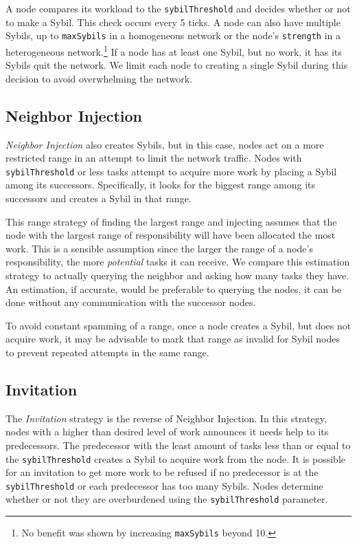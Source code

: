 \documentclass[10pt,conference]{IEEEtran}
\begin{document}
A node compares its workload to the \texttt{sybilThreshold} and decides whether or not to make a Sybil.
This check occurs every 5 ticks.
A node can also have multiple Sybils, up to \texttt{maxSybils} in a homogeneous network or the node's \texttt{strength} in a heterogeneous network.\footnote{No benefit was shown by increasing \texttt{maxSybils} beyond 10.}
If a node has at least one Sybil, but no work, it has its Sybils quit the network.
We limit each node to creating a single Sybil during this decision to avoid overwhelming the network.




\subsection{Neighbor Injection}
\label{sec:strat-neighbor}
\textit{Neighbor Injection} also creates Sybils, but in this case, nodes act on a more restricted range in an attempt to limit the network traffic.
Nodes with \texttt{sybilThreshold} or less tasks attempt to acquire more work by placing a Sybil among its successors.
Specifically, it looks for the biggest range among its successors and creates a Sybil in that range.

This range strategy of finding the largest range and injecting assumes that the node with the largest range of responsibility will have been allocated the most work.
This is a sensible assumption since the larger the range of a node's responsibility, the more \textit{potential} tasks it can receive. 
We compare this estimation strategy to actually querying the neighbor and asking how many tasks they have.
An estimation, if accurate, would be preferable to querying the nodes, it can be done without any communication with the successor nodes.

To avoid constant spamming of a range, once a node creates a Sybil, but does not acquire work, it may be advisable to mark that range as invalid for Sybil nodes to prevent repeated attempts in the same range. 


\subsection{Invitation}
The \textit{Invitation} strategy is the reverse of Neighbor Injection.
In  this strategy, nodes with a higher than desired level of work announces it needs help to its predecessors.
The predecessor with the least amount of tasks less than or equal to the \texttt{sybilThreshold} creates a Sybil to acquire work from the node.
It is possible for an invitation to get more work to be refused if no  predecessor is at the \texttt{sybilThreshold} or each predecessor has too many Sybils.
Nodes determine whether or not they are overburdened using the \texttt{sybilThreshold} parameter.
\end{document}
